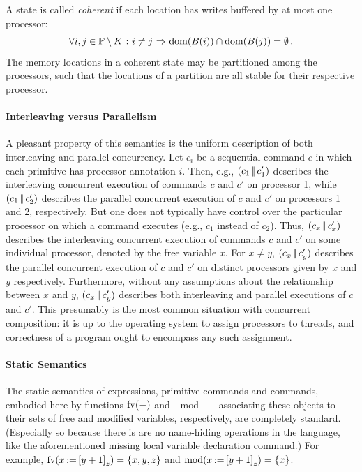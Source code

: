 \documentclass[11pt]{report}
\begin{document}
A state is called \emph{coherent} if each location has writes buffered by at most one processor: \[ \forall i,j \in \mathbb{P} \setminus K \operatorname{\,:\,} i \neq j \operatorname{\,\Rightarrow\,} \operatorname{\mathrm{dom}}(B(i)) \cap \operatorname{\mathrm{dom}}(B(j)) = \operatorname{\emptyset}.\] The memory locations in a coherent state may be partitioned among the processors, such that the locations of a partition are all stable for their respective processor.

\paragraph{Interleaving versus Parallelism} A pleasant property of this semantics is the uniform description of both interleaving and parallel concurrency. Let $c_i$ be a sequential command $c$ in which each primitive has processor annotation $i$. Then, e.g., $(c_1 \operatorname{|\!|} c'_1)$ describes the interleaving concurrent execution of commands $c$ and $c'$ on processor 1, while $(c_1 \operatorname{|\!|} c'_2)$ describes the parallel concurrent execution of $c$ and $c'$ on processors 1 and 2, respectively. But one does not typically have control over the particular processor on which a command executes (e.g., $c_1$ instead of $c_2$). Thus, $(c_x \operatorname{|\!|} c'_x)$ describes the interleaving concurrent execution of commands $c$ and $c'$ on some individual processor, denoted by the free variable $x$. For $x \neq y$, $(c_x \operatorname{|\!|} c'_y)$ describes the parallel concurrent execution of $c$ and $c'$ on distinct processors given by $x$ and $y$ respectively. Furthermore, without any assumptions about the relationship between $x$ and $y$, $(c_x \operatorname{|\!|} c'_y)$ describes both interleaving and parallel executions of $c$ and $c'$. This presumably is the most common situation with concurrent composition: it is up to the operating system to assign processors to threads, and correctness of a program ought to encompass any such assignment.

\paragraph{Static Semantics} The static semantics of expressions, primitive commands and commands, embodied here by functions $\mathrm{fv}(-)$ and $\mod{-}$ associating these objects to their sets of free and modified variables, respectively, are completely standard. (Especially so because there is are no name-hiding operations in the language, like the aforementioned missing local variable declaration command.) For example, $\mathrm{fv}(x \operatorname{:\!=} \left[ y+1 \right]_z) = \left\lbrace x,y,z \right\rbrace$ and $\mathrm{mod}(x \operatorname{:\!=} \left[ y+1 \right]_z) = \left\lbrace x \right\rbrace$.  
\end{document}
